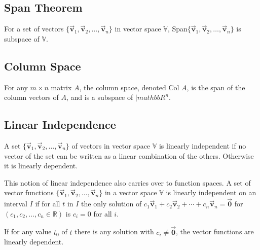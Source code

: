 \documentclass[12pt,landscape,twocolumn]{article}
\let\oldvec\vec
\renewcommand{\vec}[1]{\oldvec{\mathbf{ #1 } } }                    %
\begin{document}
    \subsection{Span Theorem}
    For a set of vectors $\{\vec{v}_1, \vec{v}_2, \ldots, \vec{v}_n\}$ in vector space $\mathbb{V}$, Span$\{\vec{v}_1, \vec{v}_2, \ldots, \vec{v}_n\}$ is subspace of $\mathbb{V}$.

    \subsection{Column Space}
    For any $m \times n$ matrix $A$, the column space, denoted Col $A$, is the span of the column vectors of $A$, and is a subspace of $|mathbb{R}^n$.

    \subsection{Linear Independence}
    A set $\{\vec{v}_1, \vec{v}_2, \ldots, \vec{v}_n\}$ of vectors in vector space $\mathbb{V}$ is linearly independent if no vector of the set can be written as a linear combination of the others. Otherwise it is linearly dependent.

    This notion of linear independence also carries over to function spaces. A set of vector functions $\{\vec{v}_1, \vec{v}_2, \ldots, \vec{v}_n\}$ in a vector space $\mathbb{V}$ is linearly independent on an interval $I$ if for all $t$ in $I$ the only solution of
    $
    c_1 \vec{v}_1 + c_2 \vec{v}_2 + \cdots + c_n \vec{v}_n = \vec{0}
    $
    for $(c_1, c_2, \ldots, c_n \in \mathbb{R})$ is $c_i = 0$ for all $i$.

    If for any value $t_0$ of $t$ there is any solution with $c_i \neq \vec{0}$, the vector functions are linearly dependent.
\end{document}
